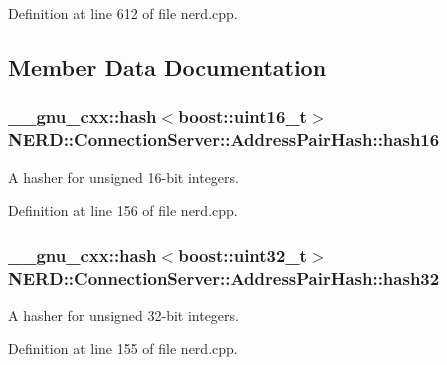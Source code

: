 \-Definition at line 612 of file nerd.\-cpp.



\subsection{\-Member \-Data \-Documentation}
\hypertarget{classNERD_1_1ConnectionServer_1_1AddressPairHash_aada49946f39b27b07f36934b5e1d5ac6}{
\subsubsection[{hash16}]{\setlength{\rightskip}{0pt plus 5cm}\-\_\-\-\_\-gnu\-\_\-cxx\-::hash$<$boost\-::uint16\-\_\-t$>$ {\bf \-N\-E\-R\-D\-::\-Connection\-Server\-::\-Address\-Pair\-Hash\-::hash16}}}
\label{classNERD_1_1ConnectionServer_1_1AddressPairHash_aada49946f39b27b07f36934b5e1d5ac6}


\-A hasher for unsigned 16-\/bit integers. 



\-Definition at line 156 of file nerd.\-cpp.

\hypertarget{classNERD_1_1ConnectionServer_1_1AddressPairHash_aa97511d9c6987cd101fb7f201f8e660a}{
\subsubsection[{hash32}]{\setlength{\rightskip}{0pt plus 5cm}\-\_\-\-\_\-gnu\-\_\-cxx\-::hash$<$boost\-::uint32\-\_\-t$>$ {\bf \-N\-E\-R\-D\-::\-Connection\-Server\-::\-Address\-Pair\-Hash\-::hash32}}}
\label{classNERD_1_1ConnectionServer_1_1AddressPairHash_aa97511d9c6987cd101fb7f201f8e660a}


\-A hasher for unsigned 32-\/bit integers. 



\-Definition at line 155 of file nerd.\-cpp.

